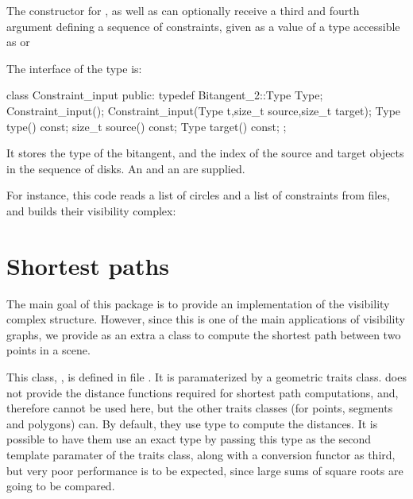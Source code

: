 The constructor for , as well as
 can optionally
receive a third and fourth argument defining a sequence of
constraints, given as a value of a type accessible as
 or 

The interface of the  type is:
\begin{ccExampleCode}
class Constraint_input {
public:
  typedef Bitangent_2::Type Type;
  Constraint_input();
  Constraint_input(Type t,size_t source,size_t target);
  Type type() const;
  size_t source() const;
  Type target() const;
};
\end{ccExampleCode}
It stores the type of the bitangent, and the index of the source and target
objects in the sequence of disks. An  and an  are supplied.

For instance, this code reads a list of circles and a list of constraints
from files, and builds their visibility complex:

\section{Shortest paths}

The main goal of this package is to provide an implementation of the
visibility complex structure. However, since this is one of the main
applications of visibility graphs, we provide as an extra a class to
compute the shortest path between two points in a scene. 

This class, , is defined in file
. It is paramaterized by a geometric traits
class.  does not provide the
distance functions required for shortest path computations, and, therefore
cannot be used here, but the other traits classes (for points, segments and
polygons) can. By default, they use type  to compute the
distances. It is possible to have them use an exact type by passing this
type as the second template paramater of the traits class, along with a
conversion functor as third, but very poor performance is to be expected,
since large sums of square roots are going to be compared.

